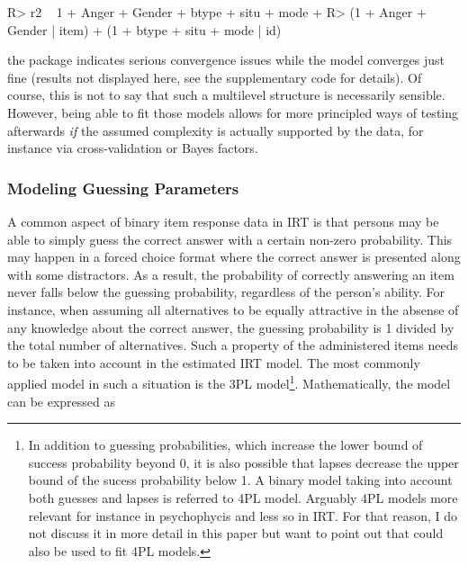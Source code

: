 \documentclass[jss]{jss}
\begin{document}
\begin{CodeChunk}

\begin{CodeInput}
R> r2 ~ 1 + Anger + Gender + btype + situ + mode + 
R>   (1 + Anger + Gender | item) + (1 + btype + situ + mode  | id)
\end{CodeInput}
\end{CodeChunk}

the  package indicates serious convergence issues while the
 model converges just fine (results not displayed here, see
the supplementary  code for details). Of course, this is not
to say that such a multilevel structure is necessarily sensible.
However, being able to fit those models allows for more principled ways
of testing afterwards \emph{if} the assumed complexity is actually
supported by the data, for instance via cross-validation or Bayes
factors.

\hypertarget{modeling-guessing-parameters}{%
\subsubsection{Modeling Guessing
Parameters}\label{modeling-guessing-parameters}}

A common aspect of binary item response data in IRT is that persons may
be able to simply guess the correct answer with a certain non-zero
probability. This may happen in a forced choice format where the correct
answer is presented along with some distractors. As a result, the
probability of correctly answering an item never falls below the
guessing probability, regardless of the person's ability. For instance,
when assuming all alternatives to be equally attractive in the absense
of any knowledge about the correct answer, the guessing probability is 1
divided by the total number of alternatives. Such a property of the
administered items needs to be taken into account in the estimated IRT
model. The most commonly applied model in such a situation is the 3PL
model\footnote{In addition to guessing probabilities, which increase the lower
bound of success probability beyond 0, it is also possible that lapses decrease
the upper bound of the sucess probability below 1. A binary model taking into
account both guesses and lapses is referred to 4PL model. Arguably 4PL models
more relevant for instance in psychophycis and less so in IRT. For that reason,
I do not discuss it in more detail in this paper but want to point out that
 could also be used to fit 4PL models.}. Mathematically, the
model can be expressed as
\end{document}
